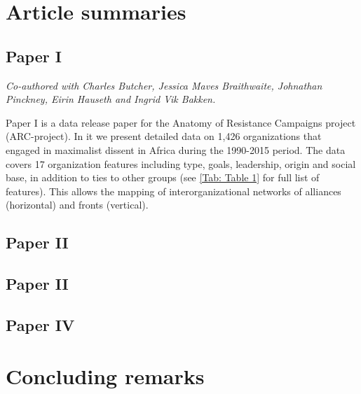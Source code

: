 \section{Article summaries} \label{Article summaries}

\subsection{Paper I} \label{Paper 1}

\textit{Co-authored with Charles Butcher, Jessica Maves Braithwaite, Johnathan
Pinckney, Eirin Hauseth and Ingrid Vik Bakken.}

Paper I is a data release paper for the Anatomy of Resistance Campaigns project
(ARC-project). In it we present detailed data on 1,426 organizations that
engaged in maximalist dissent in Africa during the 1990-2015 period. The data
covers 17 organization features including type, goals, leadership, origin and
social base, in addition to ties to other groups (see \ref{Tab: Table 1} for
full list of features). This allows the mapping of interorganizational networks
of alliances (horizontal) and fronts (vertical).

\subsection{Paper II} \label{Paper 2}

\subsection{Paper II} \label{Paper 3}

\subsection{Paper IV} \label{Paper 4}

\section{Concluding remarks} \label{Concluding remarks}

\clearpage




